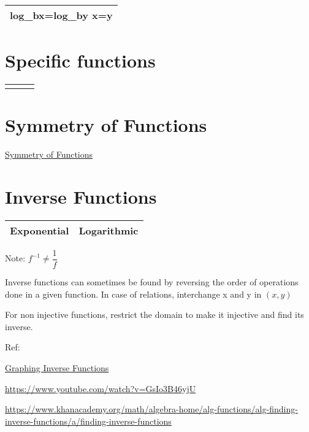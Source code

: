 \documentclass[openany]{book}
\begin{document}
\begin{tabular}{|L|}
	\hline
	log_bx=log_by \Rightarrow x=y \\
	\hline
\end{tabular}

\section{Specific functions}

\begin{tabular}{| L | L | L |}
	
	\hline
	 &  &  \\
	\hline
	
	                            \\
	
	\hline
	
\end{tabular}

\section{Symmetry of Functions}

\href{https://www.statisticshowto.com/symmetry-of-a-function/}{Symmetry of Functions}

\section{Inverse Functions}

\begin{tabular}{|L|L|}
	\hline
	Exponential & Logarithmic \\
	\hline
\end{tabular}

Note: \(f^{-1} \neq \dfrac{1}{f}\)

Inverse functions can sometimes be found by reversing the order of operations done in a given function. In case of relations, interchange x and y in \((x,y)\)

For non injective functions, restrict the domain to make it injective and find its inverse.

Ref:

\href{https://www.youtube.com/watch?v=ukEtad_aml4}{Graphing Inverse Functions}

\url{https://www.youtube.com/watch?v=GsIo3B46yjU}

\url{https://www.khanacademy.org/math/algebra-home/alg-functions/alg-finding-inverse-functions/a/finding-inverse-functions}
\end{document}
